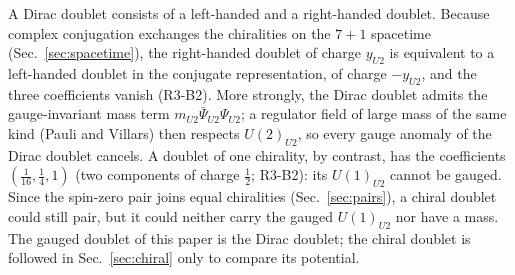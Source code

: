 A Dirac doublet consists of a left-handed and a right-handed doublet. Because complex conjugation
exchanges the chiralities on the $7+1$ spacetime (Sec.~\ref{sec:spacetime}), the right-handed
doublet of charge $y_{U2}$ is equivalent to a left-handed doublet in the conjugate representation,
of charge $-y_{U2}$, and the three coefficients vanish (R3-B2). More strongly, the Dirac doublet
admits the gauge-invariant mass term $m_{U2}\bar\Psi_{U2}\Psi_{U2}$; a regulator field of large
mass of the same kind (Pauli and Villars) then respects $U(2)_{U2}$, so every gauge anomaly of the
Dirac doublet cancels. A doublet of one chirality, by contrast, has the coefficients
$(\tfrac1{16},\tfrac14,1)$ (two components of charge $\tfrac12$; R3-B2): its $U(1)_{U2}$ cannot be
gauged. Since the spin-zero pair joins equal chiralities (Sec.~\ref{sec:pairs}), a chiral doublet
could still pair, but it could neither carry the gauged $U(1)_{U2}$ nor have a mass. The gauged
doublet of this paper is the Dirac doublet; the chiral doublet is followed in
Sec.~\ref{sec:chiral} only to compare its potential.
